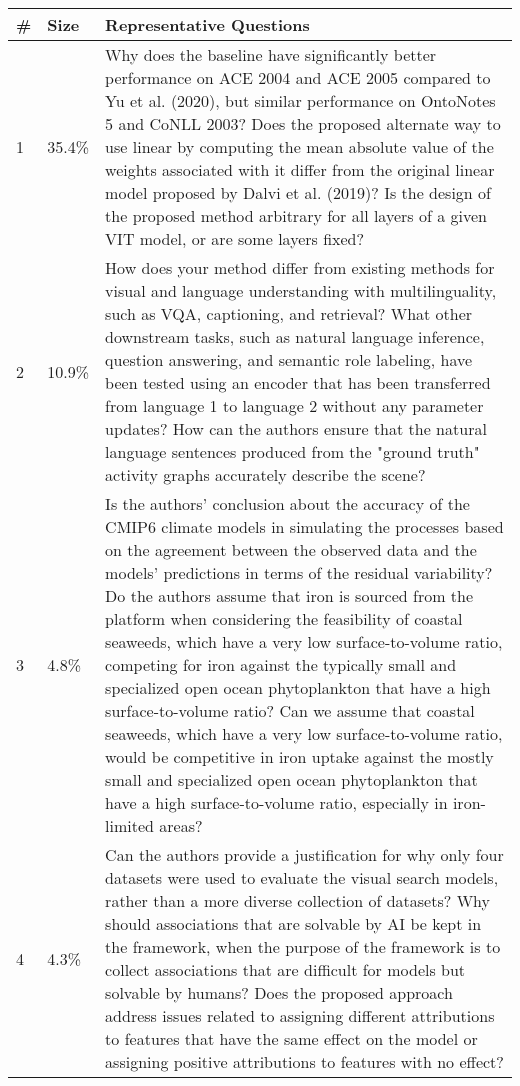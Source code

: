 \begin{table*}[!ht]
\footnotesize
\centering
\begin{tabularx}{\textwidth}{p{0.2cm}p{0.7cm}X}
\toprule
\# & Size & Representative Questions \\
\midrule
1 & 35.4\% & Why does the baseline have significantly better performance on ACE 2004 and ACE 2005 compared to Yu et al. (2020), but similar performance on OntoNotes 5 and CoNLL 2003? Does the proposed alternate way to use linear by computing the mean absolute value of the weights associated with it differ from the original linear model proposed by Dalvi et al. (2019)? Is the design of the proposed method arbitrary for all layers of a given VIT model, or are some layers fixed? \\ \midrule
2 & 10.9\% & How does your method differ from existing methods for visual and language understanding with multilinguality, such as VQA, captioning, and retrieval? What other downstream tasks, such as natural language inference, question answering, and semantic role labeling, have been tested using an encoder that has been transferred from language 1 to language 2 without any parameter updates? How can the authors ensure that the natural language sentences produced from the "ground truth" activity graphs accurately describe the scene? \\ \midrule
3 & 4.8\% & Is the authors' conclusion about the accuracy of the CMIP6 climate models in simulating the processes based on the agreement between the observed data and the models' predictions in terms of the residual variability? Do the authors assume that iron is sourced from the platform when considering the feasibility of coastal seaweeds, which have a very low surface-to-volume ratio, competing for iron against the typically small and specialized open ocean phytoplankton that have a high surface-to-volume ratio? Can we assume that coastal seaweeds, which have a very low surface-to-volume ratio, would be competitive in iron uptake against the mostly small and specialized open ocean phytoplankton that have a high surface-to-volume ratio, especially in iron-limited areas? \\ \midrule
4 & 4.3\% & Can the authors provide a justification for why only four datasets were used to evaluate the visual search models, rather than a more diverse collection of datasets? Why should associations that are solvable by AI be kept in the framework, when the purpose of the framework is to collect associations that are difficult for models but solvable by humans? Does the proposed approach address issues related to assigning different attributions to features that have the same effect on the model or assigning positive attributions to features with no effect? \\ \midrule

\end{tabularx}
\end{table*}
